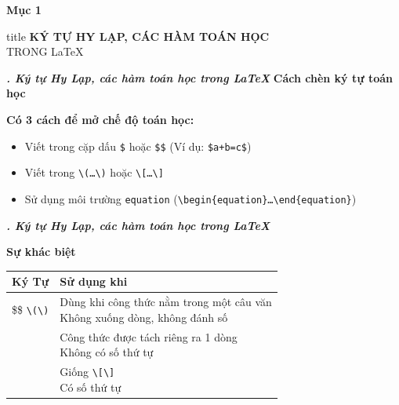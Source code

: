 \documentclass[11pt]{beamer}
\newcounter{group}
\begin{document}
	\begin{frame}{\textbf{Mục 1}}\label{Mục 1}
		\centering
		
		\vspace{1cm}
		
		\begin{beamercolorbox}[rounded=true,shadow=true,sep=1em]{title}
			\centering
			{\Huge \textbf{\MakeUppercase{ký tự Hy Lạp, các hàm toán học}}}\\[0.3cm]
			{\Large \MakeUppercase{trong} \LaTeX}
		\end{beamercolorbox}
		
		\vspace{1cm}
	\end{frame}
	\setcounter{group}{1}
	\begin{frame}{\textbf{\textit{\thegroup. Ký tự Hy Lạp, các hàm toán học trong \LaTeX}}}
		\textbf{Cách chèn ký tự toán học}
		\begin{block}{\textbf{Có 3 cách để mở chế độ toán học:}}
			\begin{itemize}
				\pause
				\item Viết trong cặp dấu \texttt{\$} hoặc \texttt{\$\$} (Ví dụ: \texttt{\$a+b=c\$})
				\pause
				\item Viết trong \texttt{\textbackslash(\dots\textbackslash)} hoặc \texttt{\textbackslash[\dots\textbackslash]}
				\pause
				\item Sử dụng môi trường \texttt{equation} (\texttt{\textbackslash begin\{equation\}\dots\textbackslash end\{equation\}})
			\end{itemize}
		\end{block}
	\end{frame}
	\begin{frame}{\textbf{\textit{\thegroup. Ký tự Hy Lạp, các hàm toán học trong \LaTeX}}}
		\begin{block}{\textbf{Sự khác biệt}}
			\begin{table}[h]
				\begin{tabular}{|c|l|}
					\hline
					\rowcolor{red!80}
					\color{white}\textbf{Ký Tự} & \color{white}\textbf{Sử dụng khi}\\
					\hline
					\makecell[l]{\$\$\\\texttt{\textbackslash(\textbackslash)}} & \makecell[l]{Dùng khi công thức nằm trong một câu văn\\Không xuống dòng, không đánh số}\\
					\hline
					\makecell[l]{\texttt{\textbackslash[\textbackslash]}} & \makecell[l]{Công thức được tách riêng ra 1 dòng\\Không có số thứ tự}\\
					\hline
					\makecell[l]{\texttt{\textbackslash begin\{equation\}}} & \makecell[l]{Giống \texttt{\textbackslash[\textbackslash]}\\Có số thứ tự}\\
					\hline
				\end{tabular}
			\end{table}
		\end{block}
	\end{frame}
\end{document}
